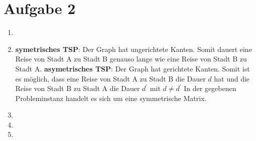 \documentclass[12pt]{article}
\begin{document}
	\section{Aufgabe 2}
	\begin{enumerate}[label=(\alph*)]
		\item 
		\item \textbf{symetrisches TSP}: Der Graph hat ungerichtete Kanten. Somit dauert eine Reise von Stadt A zu Stadt B genauso lange wie eine Reise von Stadt B zu Stadt A.\newline
		\textbf{asymetrisches TSP}: Der Graph hat gerichtete Kanten. Somit ist es möglich, dass eine Reise von Stadt A zu Stadt B die Dauer $d$ hat und die Reise von Stadt B zu Stadt A die Dauer $d^\prime$ mit $d \neq d^\prime$\newline
		In der gegebenen Probleminstanz handelt es sich um eine symmetrische Matrix.
		\item 
		\item
		\item
	\end{enumerate}
\end{document}
